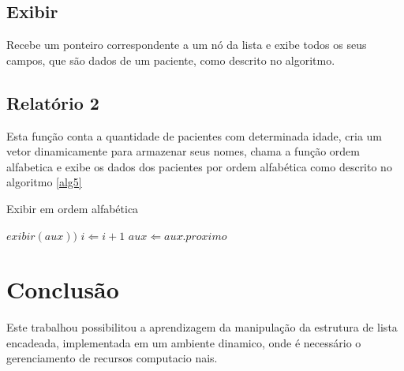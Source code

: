 \documentclass[12pt]{article}
\begin{document}
\subsection{Exibir}

Recebe um ponteiro correspondente a um nó da lista e exibe todos os seus campos,
que são dados de um paciente, como descrito no algoritmo.


\subsection{Relatório 2}

Esta função conta a quantidade de pacientes com determinada idade, cria um vetor dinamicamente
para armazenar seus nomes, chama a função ordem alfabetica e exibe os dados dos pacientes por ordem
alfabética como descrito no algoritmo \ref{alg5}

\begin{algorithm}                      %
\caption{Exibir em ordem alfabética}          %
\label{alg5}                           %
\begin{algorithmic}
            \STATE $exibir(aux))$
            \STATE $i \Leftarrow i+1$
          \ENDIF
      \ENDWHILE
      \STATE $aux \Leftarrow aux\hat.proximo$
  \ENDWHILE
\end{algorithmic}
\end{algorithm}  



\section{Conclusão}

Este trabalhou possibilitou a aprendizagem da manipulação da estrutura de lista encadeada,
implementada em um ambiente dinamico, onde é necessário o gerenciamento de recursos computacio
nais.



\end{document}
